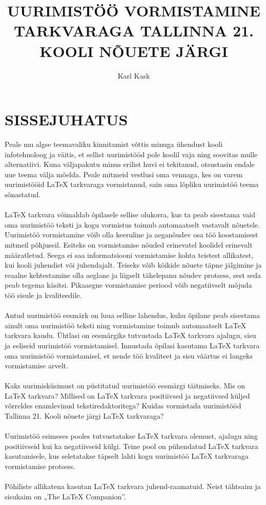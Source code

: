 \documentclass{21kuur}
\title{UURIMISTÖÖ VORMISTAMINE \latex TARKVARAGA TALLINNA 21. KOOLI NÕUETE JÄRGI}
\author{Karl Kask}
\begin{document}
\maketitle
\tableofcontents

\chapter*{SISSEJUHATUS}
Peale mu algse teemavaliku kinnitamist võttis minuga ühendust kooli infotehnoloog ja väitis, et sellist uurimistööd pole koolil vaja ning soovitas mulle alternatiivi. Kuna väljapakutu minus erilist huvi ei tekitanud, otsustasin endale uue teema välja mõelda. Peale mitmeid vestlusi oma vennaga, kes on varem uurimistööid LaTeX tarkvaraga vormistanud, sain oma lõpliku uurimistöö teema sõnastatud.
\\\\LaTeX tarkvara võimaldab õpilasele sellise olukorra, kus ta peab sisestama vaid oma uurimistöö teksti ja kogu vormistus toimub automaatselt vastavalt nõuetele. Uurimistöö vormistamine võib olla keeruline ja aeganõudev osa töö koostamisest mitmeil põhjuseil. Esiteks on vormistamise nõuded erinevatel koolidel erinevalt määratletud. Seega ei saa informatsiooni vormistamise kohta teistest allikatest, kui kooli juhendist või juhendajalt. Teiseks võib kõikide nõuete täpne jälgimine ja reaalne kehtestamine olla aeglane ja liigselt tähelepanu nõudev protsess, sest seda peab tegema käsitsi. Pikaaegne vormistamise periood võib negatiivselt mõjuda töö sisule ja kvaliteedile.
\\\\Antud uurimistöö eesmärk on luua selline lahendus, kuhu õpilane peab sisestama ainult oma uurimistöö teksti ning vormistamine toimub automaatselt LaTeX tarkvara kaudu. Ühtlasi on eesmärgiks tutvustada LaTeX tarkvara ajalugu, sisu ja eeliseid uurimistöö vormistamisel. Innustada õpilasi kasutama LaTeX tarkvara oma uurimistöö vormistamisel, et nende töö kvaliteet ja sisu väärtus ei langeks vormistamise arvelt. 
\\\\Kaks uurimisküsimust on püstitatud uurimistöö eesmärgi täitmiseks. Mis on LaTeX tarkvara? Millised on LaTeX tarkvara positiivsed ja negatiivsed küljed võrreldes enamlevinud tekstiredaktoritega? Kuidas vormistada uurimistööd Tallinna 21. Kooli nõuete järgi LaTeX tarkvaraga?
\\\\Uurimistöö esimeses pooles tutvustatakse LaTeX tarkvara olemust, ajalugu ning positiivseid kui ka negatiivseid külgi. Teine pool on pühendatud LaTeX tarkvara kasutamisele, kus seletatakse täpselt lahti kogu uurimistöö LaTeX tarkvaraga vormistamise protsess.
\\\\Põhiliste allikatena kasutan LaTeX tarkvara juhend-raamatuid. Neist tähtsaim ja sisukaim on „The LaTeX Companion”.
\end{document}
